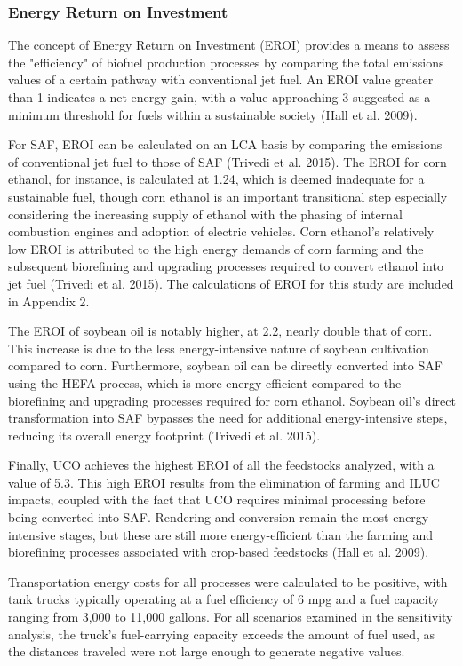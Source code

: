 \documentclass[12pt]{article}
\begin{document}
\subsubsection{Energy Return on Investment}

The concept of Energy Return on Investment (EROI) provides a means to assess the "efficiency" of biofuel production processes by comparing the total emissions values of a certain pathway with conventional jet fuel. An EROI value greater than 1 indicates a net energy gain, with a value approaching 3 suggested as a minimum threshold for fuels within a sustainable society (Hall et al. 2009).

For SAF, EROI can be calculated on an LCA basis by comparing the emissions of conventional jet fuel to those of SAF (Trivedi et al. 2015). The EROI for corn ethanol, for instance, is calculated at 1.24, which is deemed inadequate for a sustainable fuel, though corn ethanol is an important transitional step especially considering the increasing supply of ethanol with the phasing of internal combustion engines and adoption of electric vehicles. Corn ethanol’s relatively low EROI is attributed to the high energy demands of corn farming and the subsequent biorefining and upgrading processes required to convert ethanol into jet fuel (Trivedi et al. 2015). The calculations of EROI for this study are included in Appendix 2.

The EROI of soybean oil is notably higher, at 2.2, nearly double that of corn. This increase is due to the less energy-intensive nature of soybean cultivation compared to corn. Furthermore, soybean oil can be directly converted into SAF using the HEFA process, which is more energy-efficient compared to the biorefining and upgrading processes required for corn ethanol. Soybean oil’s direct transformation into SAF bypasses the need for additional energy-intensive steps, reducing its overall energy footprint (Trivedi et al. 2015).

Finally, UCO achieves the highest EROI of all the feedstocks analyzed, with a value of 5.3. This high EROI results from the elimination of farming and ILUC impacts, coupled with the fact that UCO requires minimal processing before being converted into SAF. Rendering and conversion remain the most energy-intensive stages, but these are still more energy-efficient than the farming and biorefining processes associated with crop-based feedstocks (Hall et al. 2009).

Transportation energy costs for all processes were calculated to be positive, with tank trucks typically operating at a fuel efficiency of 6 mpg and a fuel capacity ranging from 3,000 to 11,000 gallons. For all scenarios examined in the sensitivity analysis, the truck’s fuel-carrying capacity exceeds the amount of fuel used, as the distances traveled were not large enough to generate negative values. 
\end{document}
